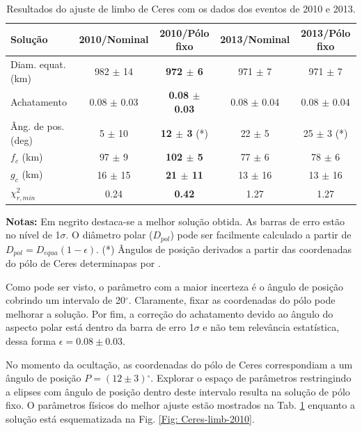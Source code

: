 \documentclass[12pt,a4paper]{monografia}
\newcommand{\degr}{\ensuremath{^{\circ}}}%
\begin{document}
\begin{table}[h]
 \begin{centering}
  \caption{Resultados do ajuste de limbo de Ceres com os dados dos eventos de 2010 e 2013.\label{Tab: resultados}}
  \begin{tabular}{@{}lcccc}
  \hline
     Solução & 2010/Nominal & \textbf{2010/Pólo fixo} & 2013/Nominal & 2013/Pólo fixo \\
\hline
Diam. equat.  (km) & 982 $\pm$ 14 & \textbf{972 $\pm$ 6}  & 971 $\pm$ 7  & 971 $\pm$ 7\\
Achatamento        & 0.08 $\pm$ 0.03 & \textbf{0.08 $\pm$ 0.03} & 0.08 $\pm$ 0.04 & 0.08 $\pm$ 0.04\\
Âng. de pos. (deg)   & 5 $\pm$ 10    & \textbf{12 $\pm$ 3} (*)& 22 $\pm$ 5    & 25 $\pm$ 3 (*)\\
$f_c$ (km)             & 97 $\pm$ 9   & \textbf{102 $\pm$ 5}   & 77 $\pm$ 6    & 78 $\pm$ 6\\
$g_c$ (km)             & 16 $\pm$ 15  & \textbf{21 $\pm$ 11}  & 13 $\pm$ 16   & 13 $\pm$ 16\\
$\chi^2_{r,min}$       & 0.24          &  \textbf{0.42}         & 1.27          & 1.27\\
\hline
\end{tabular}
\textbf{Notas:} Em negrito destaca-se a melhor solução obtida. As barras de erro estão no nível de 1$\sigma$. O diâmetro polar ($D_{pol}$) pode ser facilmente calculado a partir de $D_{pol}=D_{equa}(1 - \epsilon)$. (*) Ângulos de posição derivados a partir das coordenadas do pólo de Ceres determinapas por \cite{Drummond2014}.
\end{centering}
\end{table}

Como pode ser visto, o parâmetro com a maior incerteza é o ângulo de posição cobrindo um intervalo de 20$\degr$. Claramente, fixar as coordenadas do pólo pode melhorar a solução. Por fim, a correção do achatamento devido ao ângulo do aspecto polar está dentro da barra de erro 1$\sigma$ e não tem relevância estatística, dessa forma $\epsilon = 0.08 \pm 0.03$.

No momento da ocultação, as coordenadas do pólo de Ceres correspondiam a um ângulo de posição $P = (12 \pm 3)\degr$. Explorar o espaço de parâmetros restringindo a elipses com ângulo de posição dentro deste intervalo resulta na solução de pólo fixo. O parâmetros físicos do melhor ajuste estão mostrados na Tab. \ref{Tab: resultados} enquanto a solução está esquematizada na Fig. \ref{Fig: Ceres-limb-2010}.
\end{document}

